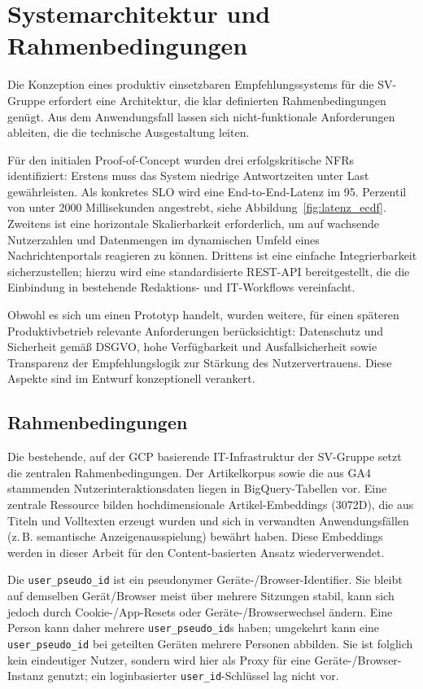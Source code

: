 \section{Systemarchitektur und Rahmenbedingungen}
Die Konzeption eines produktiv einsetzbaren Empfehlungssystems für die SV-Gruppe erfordert eine Architektur, 
die klar definierten Rahmenbedingungen genügt. Aus dem Anwendungsfall lassen sich nicht-funktionale Anforderungen ableiten,
 die die technische Ausgestaltung leiten.
\label{sec:nfr}

Für den initialen Proof-of-Concept wurden drei erfolgskritische \ac{NFR}s identifiziert:
Erstens muss das System niedrige Antwortzeiten unter Last gewährleisten. Als konkretes \ac{SLO} wird eine 
End-to-End-Latenz im 95. Perzentil von unter 2000 Millisekunden angestrebt, siehe Abbildung~\ref{fig:latenz_ecdf}.
Zweitens ist eine horizontale Skalierbarkeit erforderlich, um auf wachsende Nutzerzahlen und Datenmengen 
im dynamischen Umfeld eines Nachrichtenportals reagieren zu können.
Drittens ist eine einfache Integrierbarkeit sicherzustellen; hierzu wird eine standardisierte REST-API bereitgestellt, 
die die Einbindung in bestehende Redaktions- und IT-Workflows vereinfacht.


Obwohl es sich um einen Prototyp handelt, wurden weitere, für einen späteren Produktivbetrieb relevante Anforderungen 
berücksichtigt: Datenschutz und Sicherheit gemäß \ac{DSGVO}, hohe Verfügbarkeit und Ausfallsicherheit sowie 
Transparenz der Empfehlungslogik zur Stärkung des Nutzervertrauens. Diese Aspekte sind im Entwurf konzeptionell verankert.

\subsection{Rahmenbedingungen}
Die bestehende, auf der \ac{GCP} basierende IT-Infrastruktur der SV-Gruppe setzt die zentralen Rahmenbedingungen. 
Der Artikelkorpus sowie die aus \ac{GA4} stammenden Nutzerinteraktionsdaten liegen in BigQuery-Tabellen vor. 
Eine zentrale Ressource bilden hochdimensionale Artikel-Embeddings (3072D), die aus Titeln und Volltexten erzeugt 
wurden und sich in verwandten Anwendungsfällen (z.\,B. semantische Anzeigenausspielung) bewährt haben. 
Diese Embeddings werden in dieser Arbeit für den Content-basierten Ansatz wiederverwendet.

Die \texttt{user\_pseudo\_id} ist ein pseudonymer Geräte-/Browser-Identifier. Sie bleibt auf demselben Gerät/Browser 
meist über mehrere Sitzungen stabil, kann sich jedoch durch Cookie-/App-Resets oder Geräte-/Browserwechsel ändern. 
Eine Person kann daher mehrere \texttt{user\_pseudo\_id}s haben; umgekehrt kann eine \texttt{user\_pseudo\_id} bei 
geteilten Geräten mehrere Personen abbilden. Sie ist folglich kein eindeutiger Nutzer, sondern wird hier als Proxy 
für eine Geräte-/Browser-Instanz genutzt; ein loginbasierter \texttt{user\_id}-Schlüssel lag nicht vor.

